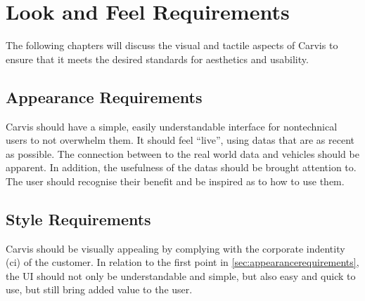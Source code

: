 \chapter{Look and Feel Requirements}
\label{chap:lookandfeel}
The following chapters will discuss the visual and tactile aspects of Carvis to ensure that it meets the desired standards for aesthetics and usability.
\section{Appearance Requirements}
\label{sec:appearancerequirements}

Carvis should have a simple, easily understandable interface for \gls{nontechnical} users to not overwhelm them. It should feel \enquote{live}, using \glspl{data} that are as recent as possible. 
The connection between to the real world data and vehicles should be apparent. In addition, the usefulness of the \glspl{data} should be brought attention to. The user should recognise their benefit and be inspired as to how to use them.

\section{Style Requirements}
Carvis should be visually appealing by complying with the corporate indentity (\gls{ci}) of the customer.
In relation to the first point in \autoref{sec:appearancerequirements}, the UI should not only be understandable and simple, but also easy and quick to use, but still bring added value to the user.